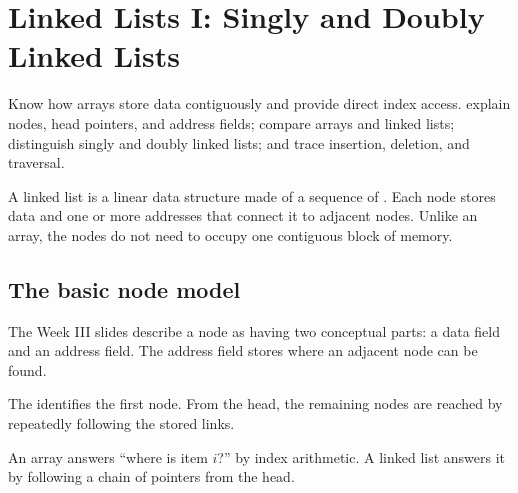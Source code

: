 \chapter{Linked Lists I: Singly and Doubly Linked Lists}
\label{ch:linked-lists}

\chapterguide%
  {Know how arrays store data contiguously and provide direct index access.}
  {explain nodes, head pointers, and address fields; compare arrays and linked lists; distinguish singly and doubly linked lists; and trace insertion, deletion, and traversal.}

A linked list is a linear data structure made of a sequence of . Each node stores data and one or more addresses that connect it to adjacent nodes. Unlike an array, the nodes do not need to occupy one contiguous block of memory.

\section{The basic node model}

The Week III slides describe a node as having two conceptual parts: a data field and an address field. The address field stores where an adjacent node can be found.

\begin{mlfigure}
\end{mlfigure}

The  identifies the first node. From the head, the remaining nodes are reached by repeatedly following the stored links.

\begin{keyidea}
An array answers ``where is item $i$?'' by index arithmetic. A linked list answers it by following a chain of pointers from the head.
\end{keyidea}

